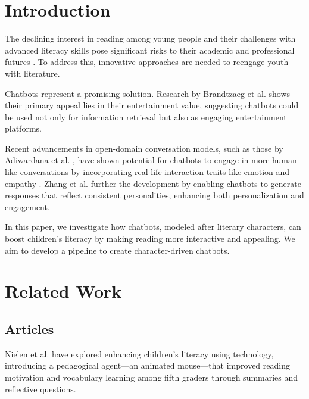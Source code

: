 \documentclass[fleqn,moreauthors,10pt]{ds_report}
\affiliation{\textit{Advisors: Slavko Žitnik}}
\begin{document}
\flushbottom 

\maketitle 


\section*{Introduction}

The declining interest in reading among young people and their challenges with advanced literacy skills pose significant risks to their academic and professional futures \cite{murray2021literacy}. To address this, innovative approaches are needed to reengage youth with literature.

Chatbots represent a promising solution. Research by Brandtzaeg et al. \cite{why_chatbots} shows their primary appeal lies in their entertainment value, suggesting chatbots could be used not only for information retrieval but also as engaging entertainment platforms.

Recent advancements in open-domain conversation models, such as those by Adiwardana et al. \cite{adiwardana2020towards}, have shown potential for chatbots to engage in more human-like conversations by incorporating real-life interaction traits like emotion \cite{zhou2018emotional} and empathy \cite{rashkin2018towards_empathy}. Zhang et al. \cite{zhang2018personalizing} further the development by enabling chatbots to generate responses that reflect consistent personalities, enhancing both personalization and engagement.

In this paper, we investigate how chatbots, modeled after literary characters, can boost children's literacy by making reading more interactive and appealing. We aim to develop a pipeline to create character-driven chatbots.

\section*{Related Work}

\subsection*{Articles}
Nielen et al. \cite{nielen2018digital} have explored enhancing children's literacy using technology, introducing a pedagogical agent—an animated mouse—that improved reading motivation and vocabulary learning among fifth graders through summaries and reflective questions.
\end{document}

